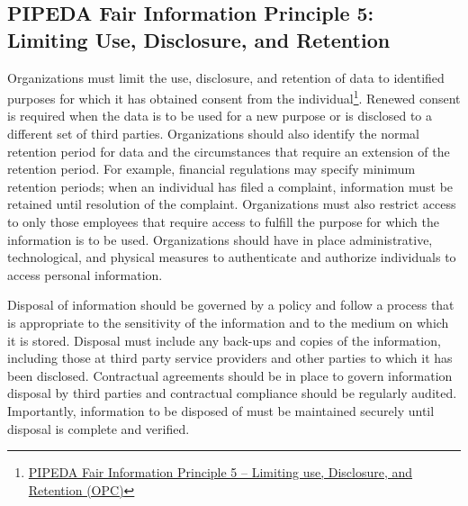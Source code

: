 \subsection*{PIPEDA Fair Information Principle 5: Limiting Use, Disclosure, and Retention}

Organizations must limit the use, disclosure, and retention of data to identified purposes for which it has obtained consent from the individual\footnote{\href{https://www.priv.gc.ca/en/privacy-topics/privacy-laws-in-canada/the-personal-information-protection-and-electronic-documents-act-pipeda/p_principle/principles/p_use/}{PIPEDA Fair Information Principle 5 -- Limiting use, Disclosure, and Retention (OPC)}}. Renewed consent is required when the data is to be used for a new purpose or is disclosed to a different set of third parties. Organizations should also identify the normal retention period for data and the circumstances that require an extension of the retention period. For example, financial regulations may specify minimum retention periods; when an individual has filed a complaint, information must be retained until resolution of the complaint. Organizations must also restrict access to only those employees that require access to fulfill the purpose for which the information is to be used. Organizations should have in place administrative, technological, and physical measures to authenticate and authorize individuals to access personal information.

Disposal of information should be governed by a policy and follow a process that is appropriate to the sensitivity of the information and to the medium on which it is stored. Disposal must include any back-ups and copies of the information, including those at third party service providers and other parties to which it has been disclosed. Contractual agreements should be in place to govern information disposal by third parties and contractual compliance should be regularly audited. Importantly, information to be disposed of must be maintained securely until disposal is complete and verified. 

